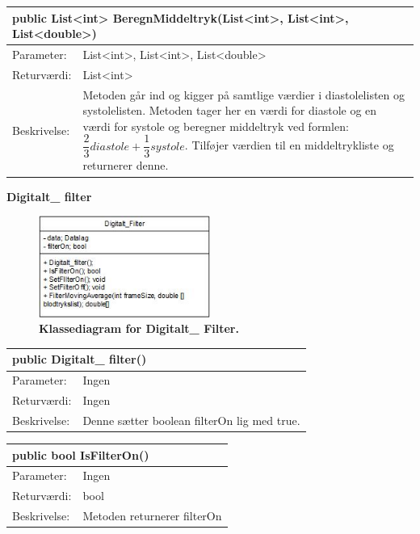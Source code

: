 \begin{table}[H]
\label{tab:tabel2}
\begin{tabular}{| l | p{13cm} |}
   \hline
   \multicolumn{2}{|l|}{public List<int> BeregnMiddeltryk(List<int>, List<int>, List<double>)} \\ \hline
   Parameter: & List<int>, List<int>, List<double>\\ \hline
   Returværdi: & List<int> \\ \hline
   Beskrivelse: & Metoden går ind og kigger på samtlige værdier i diastolelisten og systolelisten. Metoden tager  her en værdi for diastole og en værdi for systole og beregner middeltryk ved formlen: $\dfrac{2}{3}diastole+\dfrac{1}{3}systole$. Tilføjer værdien til en middeltrykliste og returnerer denne. \\ \hline
\end{tabular}
\end{table}
\textbf{Digitalt\_ filter}
\begin{figure}[H]
\includegraphics[width =0.5\textwidth , center]{billeder/klassediagramdigi}
\caption{\textbf{Klassediagram for Digitalt\_ Filter.}}
\end{figure}
\begin{table}[H]
\label{tab:tabel2}
\begin{tabular}{| l | p{13cm} |}
   \hline
   \multicolumn{2}{|l|}{public Digitalt\_ filter()} \\ \hline
   Parameter: & Ingen\\ \hline
   Returværdi: & Ingen \\ \hline
   Beskrivelse: & Denne sætter boolean filterOn lig med true. \\ \hline
\end{tabular}
\end{table}
\begin{table}[H]
\label{tab:tabel2}
\begin{tabular}{| l | p{13cm} |}
   \hline
   \multicolumn{2}{|l|}{public bool IsFilterOn()} \\ \hline
   Parameter: & Ingen\\ \hline
   Returværdi: & bool\\ \hline
   Beskrivelse: & Metoden returnerer filterOn\\ \hline
\end{tabular}
\end{table}
